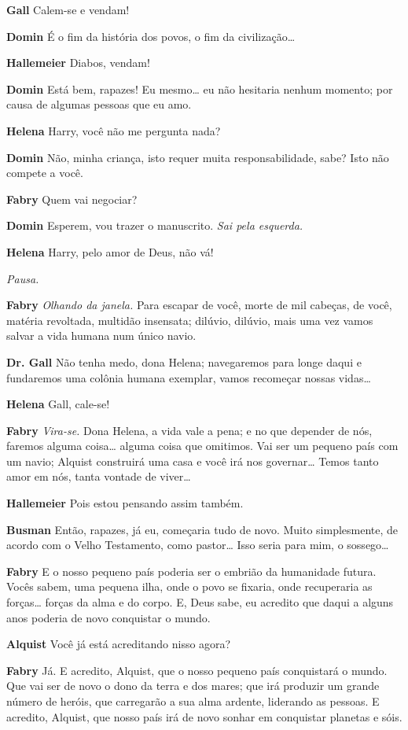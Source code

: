 \textbf{Gall} Calem-se e vendam!

\textbf{Domin} É o fim da história dos povos, o fim da civilização\ldots{}

\textbf{Hallemeier} Diabos, vendam!

\textbf{Domin} Está bem, rapazes! Eu mesmo\ldots{} eu não hesitaria nenhum momento; por causa
de algumas pessoas que eu amo.

\textbf{Helena} Harry, você não me pergunta nada?

\textbf{Domin} Não, minha criança, isto requer muita responsabilidade, sabe? Isto não compete a você.

\textbf{Fabry} Quem vai negociar?

\textbf{Domin} Esperem, vou trazer o manuscrito. \emph{Sai pela esquerda.}

\textbf{Helena} Harry, pelo amor de Deus, não vá!

\emph{Pausa.}

\textbf{Fabry} \emph{Olhando da janela.} Para escapar de você, morte de mil cabeças,
de você, matéria revoltada, multidão insensata; dilúvio, dilúvio, mais uma vez
vamos salvar a vida humana num único navio.

\textbf{Dr. Gall} Não tenha medo, dona Helena; navegaremos para longe daqui e fundaremos
uma colônia humana exemplar, vamos recomeçar nossas vidas\ldots{}

\textbf{Helena} Gall, cale-se!

\textbf{Fabry} \emph{Vira-se.} Dona Helena, a vida vale a pena; e no que depender
de nós, faremos alguma coisa\ldots{} alguma coisa que omitimos. Vai ser um
pequeno país com um navio; Alquist construirá uma casa e você irá nos
governar\ldots{} Temos tanto amor em nós, tanta vontade de viver\ldots{}

\textbf{Hallemeier} Pois estou pensando assim também.

\textbf{Busman} Então, rapazes, já eu, começaria tudo de novo. Muito simplesmente, de acordo
com o Velho Testamento, como pastor\ldots{} Isso seria para mim, o sossego\ldots{}

\textbf{Fabry} E o nosso pequeno país poderia ser o embrião da humanidade futura. Vocês
sabem, uma pequena ilha, onde o povo se fixaria, onde recuperaria as forças\ldots{}
forças da alma e do corpo. E, Deus sabe, eu acredito que daqui a alguns anos
poderia de novo conquistar o mundo.

\textbf{Alquist} Você já está acreditando nisso agora?

\textbf{Fabry} Já. E acredito, Alquist, que o nosso pequeno país conquistará
o mundo. Que vai ser de novo o dono da terra e dos mares; que irá produzir um
grande número de heróis, que carregarão a sua alma ardente, liderando as pessoas.
E acredito, Alquist, que nosso país irá de novo sonhar em conquistar planetas e sóis.

